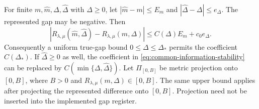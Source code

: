 \begin{theorem}
\label{thm:common-information-stability}
For finite $m,\widehat m,\Delta,\widehat\Delta$ with $\Delta\geq0$, let
$|\widehat m-m|\leq E_m$ and
$|\widehat\Delta-\Delta|\leq e_\Delta$. The represented gap may be
negative. Then
\begin{equation}
 |R_{\lambda,\mu}(\widehat m,\widehat\Delta)
                       -R_{\lambda,\mu}(m,\Delta)|
 \leq C(\Delta)E_m+c_0e_\Delta.
 \label{eq:common-information-stability}
\end{equation}
Consequently a uniform true-gap bound $0\leq\Delta\leq\Delta_*$ permits
the coefficient $C(\Delta_*)$. If $\widehat\Delta\geq0$ as well, the
coefficient in \eqref{eq:common-information-stability} can be replaced
by $C(\min\{\Delta,\widehat\Delta\})$.
Let $\Pi_{[0,B]}$ be metric projection onto $[0,B]$, where $B>0$ and
$R_{\lambda,\mu}(m,\Delta)\in[0,B]$. The same upper bound applies after
projecting the represented difference onto $[0,B]$. Projection need not
be inserted into the implemented gap register.
\end{theorem}
